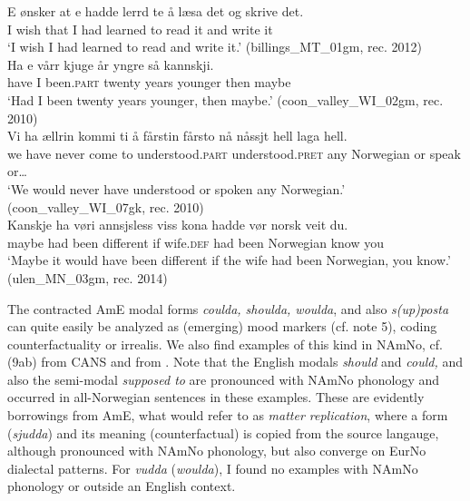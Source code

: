 \documentclass[output=paper]{langscibook}
\begin{document}
\ea%
    \label{ex:eide:8}
    \ea \label{ex:eide:8a} 
    \gll E ønsker at e hadde lerrd {te å} læsa det og skrive det.   \\
         I wish that I had learned to read it and write it       \\
    \glt ‘I wish I had learned to read and write it.’ ({{billings\_MT\_01gm}}, rec. 2012)\\
    \ex \label{ex:eide:8b} 
    \gll Ha e vårr kjuge år yngre så kannskji.      \\
         have I been.\textsc{part} twenty years younger then maybe   \\
    \glt ‘Had I been twenty years younger, then maybe.’ ({{coon\_valley\_WI\_02gm}}, rec. 2010)\\
    \ex \label{ex:eide:8c} 
    \gll Vi ha ællrin kommi {ti å} fårstin fårsto nå nåssjt hell laga hell. \\
         we have never come to understood.\textsc{part} understood.\textsc{pret} any Norwegian or speak or…\\
    \glt ‘We would never have understood or spoken any Norwegian.’ ({{coon\_valley\_WI\_07gk}}, rec. 2010)\\
    \ex \label{ex:eide:8d} 
    \gll Kanskje ha vøri annsjsless viss kona hadde vør norsk veit du. \\
         maybe had been different if wife.\textsc{def} had been Norwegian know you\\
    \glt ‘Maybe it would have been different if the wife had been Norwegian, you know.’ 
  ({{ulen\_MN\_03gm}}, rec. 2014)\\
    \z %
\z

The contracted AmE modal forms \textit{coulda, shoulda, woulda}, and also \textit{s(up)posta} can quite easily be analyzed as (emerging) mood markers (cf. note 5), coding counterfactuality or irrealis. We also find examples of this kind in NAmNo, cf. (9ab) from CANS and  from  \citet[258]{EideHjelde2015Verb}. Note that the English modals \textit{should} and \textit{could,} and also the semi-modal \textit{supposed to} are pronounced with NAmNo phonology and occurred in all-Norwegian sentences in these examples. These are evidently borrowings from AmE, what \citet{MatrasSakel2007} would refer to as \textit{matter replication}, where a form (\textit{sjudda}) and its meaning (counterfactual) is copied from the source langauge, although pronounced with NAmNo phonology, but also converge on EurNo dialectal patterns. For \textit{vudda} (\emph{woulda}), I found no examples with NAmNo phonology or outside an English context. 
\end{document}
